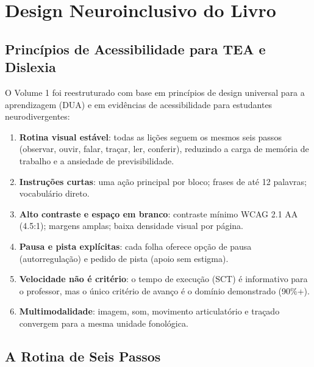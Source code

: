 
\chapter{Design Neuroinclusivo do Livro}

\section{Princípios de Acessibilidade para TEA e Dislexia}

O Volume 1 foi reestruturado com base em princípios de design universal para a aprendizagem (DUA) e em evidências de acessibilidade para estudantes neurodivergentes:

\begin{enumerate}[leftmargin=2cm]
  \item \textbf{Rotina visual estável}: todas as lições seguem os mesmos seis passos (observar, ouvir, falar, traçar, ler, conferir), reduzindo a carga de memória de trabalho e a ansiedade de previsibilidade.
  \item \textbf{Instruções curtas}: uma ação principal por bloco; frases de até 12 palavras; vocabulário direto.
  \item \textbf{Alto contraste e espaço em branco}: contraste mínimo WCAG 2.1 AA (4.5:1); margens amplas; baixa densidade visual por página.
  \item \textbf{Pausa e pista explícitas}: cada folha oferece opção de pausa (autorregulação) e pedido de pista (apoio sem estigma).
  \item \textbf{Velocidade não é critério}: o tempo de execução (SCT) é informativo para o professor, mas o único critério de avanço é o domínio demonstrado (90\%+).
  \item \textbf{Multimodalidade}: imagem, som, movimento articulatório e traçado convergem para a mesma unidade fonológica.
\end{enumerate}

\section{A Rotina de Seis Passos}


